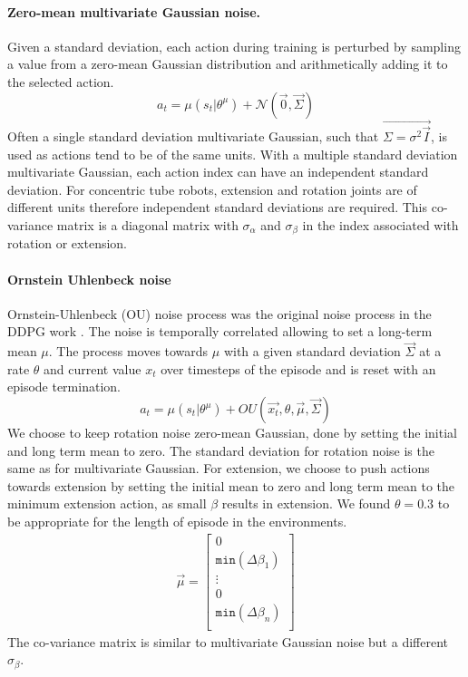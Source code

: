 \paragraph{Zero-mean multivariate Gaussian noise.}
Given a standard deviation, each action during training is perturbed by sampling a value from a zero-mean Gaussian distribution and arithmetically adding it to the selected action.
\begin{equation}
    a_t = \mu(s_t | \theta^\mu) + \mathcal{N} (\Vec{0}, \Vec{\Sigma}) \label{eqn:action-multivariate-gaussian}
\end{equation}
Often a single standard deviation multivariate Gaussian, such that $\Vec{\Sigma = \sigma^2 \Vec{I}}$, is used as actions tend to be of the same units. With a multiple standard deviation multivariate Gaussian, each action index can have an independent standard deviation. For concentric tube robots, extension and rotation joints are of different units therefore independent standard deviations are required. This co-variance matrix is a diagonal matrix with $\sigma_\alpha$ and $\sigma_\beta$ in the index associated with rotation or extension.

\paragraph{Ornstein Uhlenbeck noise}
Ornstein-Uhlenbeck (OU) noise process was the original noise process in the DDPG work  \cite{Lillicrap2015}. The noise is temporally correlated allowing to set a long-term mean $\mu$. The process moves towards $\mu$ with a given standard deviation $\Vec{\Sigma}$ at a rate $\theta$ and current value $x_t$ over timesteps of the episode and is reset with an episode termination.
\begin{equation}
    a_t = \mu(s_t | \theta^\mu) + OU \left( \Vec{x_{t}}, \theta, \Vec{\mu}, \Vec{\Sigma} \right) \label{eqn:action-ou}
\end{equation}
We choose to keep rotation noise zero-mean Gaussian, done by setting the initial and long term mean to zero. The standard deviation for rotation noise is the same as for multivariate Gaussian. For extension, we choose to push actions towards extension by setting the initial mean to zero and long term mean to the minimum extension action, as small $\beta$ results in extension. We found $\theta=0.3$ to be appropriate for the length of episode in the environments.
\begin{equation}
\begin{aligned}
\Vec{\mu} =
\left [
\begin{matrix}
0 \\
\texttt{min}(\Delta \beta_1) \\
\vdots \\
0 \\
\texttt{min}(\Delta \beta_n) \\
\end{matrix}
\right ]
\end{aligned} \label{eqn:mean-ou}
\end{equation}
The co-variance matrix is similar to multivariate Gaussian noise but a different $\sigma_\beta$.

